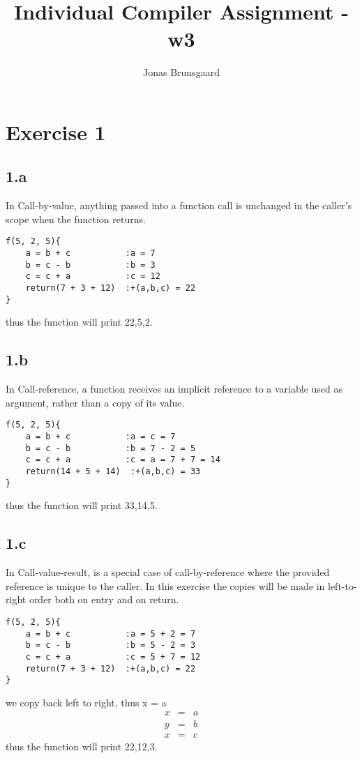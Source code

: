 \documentclass[11pt,a4paper]{article}
\title{Individual Compiler Assignment - w3}
\author{Jonas Brunsgaard}
\begin{document}
\maketitle

\section{Exercise 1}
\subsection{1.a}
In Call-by-value, anything passed into a function call is unchanged in the
caller's scope when the function returns.
\begin{lstlisting}
f(5, 2, 5){
    a = b + c           :a = 7
    b = c - b           :b = 3
    c = c + a           :c = 12
    return(7 + 3 + 12)  :+(a,b,c) = 22
}
\end{lstlisting}
thus the function will print 22,5,2.

\subsection{1.b}
In Call-reference, a function receives an implicit reference to a variable
used as argument, rather than a copy of its value.

\begin{lstlisting}
f(5, 2, 5){
    a = b + c           :a = c = 7
    b = c - b           :b = 7 - 2 = 5
    c = c + a           :c = a = 7 + 7 = 14
    return(14 + 5 + 14)  :+(a,b,c) = 33
}
\end{lstlisting}
thus the function will print 33,14,5.

\subsection{1.c}
In Call-value-result, is a special case of call-by-reference where the
provided reference is unique to the caller. In this exercise the copies will
be made in left-to-right order both on entry and on return.

\begin{lstlisting}
f(5, 2, 5){
    a = b + c           :a = 5 + 2 = 7
    b = c - b           :b = 5 - 2 = 3
    c = c + a           :c = 5 + 7 = 12
    return(7 + 3 + 12)  :+(a,b,c) = 22
}
\end{lstlisting}
we copy back left to right, thus x = a
$$
\begin{array}{lcl}
    x & = & a \\
    y & = & b \\
    x & = & c
\end{array}
$$
thus the function will print 22,12,3.
\end{document}
